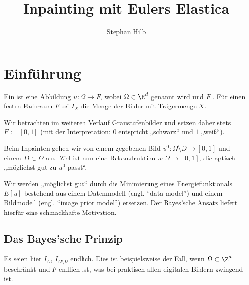 \documentclass{mythesis}
\title{Inpainting mit Eulers Elastica}
\author{Stephan Hilb}
\begin{document}


\chapter{Einführung}




\begin{definition} \label{def:image}
    Ein  ist eine Abbildung $u: \Omega \to F$, wobei $\Omega \subset \R^d$
     genannt wird und $F$ .
    Für einen festen Farbraum $F$ sei $I_X$ die Menge der Bilder mit Trägermenge $X$.
    \begin{note}
	Wir betrachten im weiteren Verlauf Graustufenbilder und setzen daher stets $F := [0,1]$ (mit der
	Interpretation: $0$ entspricht „schwarz“ und $1$ „weiß“).
    \end{note}
\end{definition}

Beim Inpainten gehen wir von einem gegebenen Bild $u^0: \Omega \setminus D \to [0,1]$ und einem 
$D \subset \Omega$ aus. Ziel ist nun eine Rekonstruktion $u: \Omega \to [0,1]$, die optisch „möglichst gut zu $u^0$ passt“.

Wir werden „möglichst gut“ durch die Minimierung eines Energiefunktionals $E[u]$ bestehend aus einem Datenmodell (engl. “data model”) und einem Bildmodell (engl. “image prior model”) ersetzen.
Der Bayes'sche Ansatz liefert hierfür eine schmackhafte Motivation.


\section{Das Bayes'sche Prinzip}

Es seien hier $I_\Omega$, $I_{\Omega \setminus D}$ endlich.
Dies ist beispielsweise der Fall, wenn $\Omega \subset \Z^d$ beschränkt und $F$ endlich ist, was bei praktisch allen digitalen Bildern zwingend ist.
\end{document}
